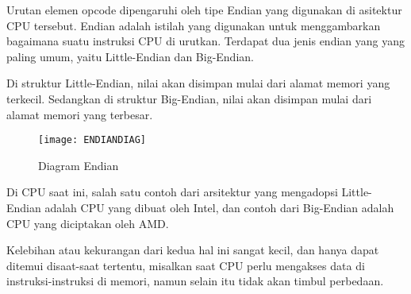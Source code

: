 Urutan elemen opcode dipengaruhi oleh tipe Endian yang digunakan di asitektur CPU
tersebut. Endian adalah istilah yang digunakan untuk menggambarkan bagaimana suatu
instruksi CPU di urutkan. Terdapat dua jenis endian yang yang paling umum, yaitu
Little-Endian dan Big-Endian.

Di struktur Little-Endian, nilai akan disimpan mulai dari alamat memori yang terkecil. Sedangkan
di struktur Big-Endian, nilai akan disimpan mulai dari alamat memori yang terbesar.

\begin{figure}[h]
    \centering
    \texttt{[image: ENDIANDIAG]}
    \caption{Diagram Endian}
    \label{fig:ENDIANDIAG}
\end{figure}

Di CPU saat ini, salah satu contoh dari arsitektur yang mengadopsi Little-Endian adalah CPU
yang dibuat oleh Intel, dan contoh dari Big-Endian adalah CPU yang diciptakan oleh AMD.

Kelebihan atau kekurangan dari kedua hal ini sangat kecil, dan hanya dapat ditemui
disaat-saat tertentu, misalkan saat CPU perlu mengakses data di instruksi-instruksi
di memori, namun selain itu tidak akan timbul perbedaan.
